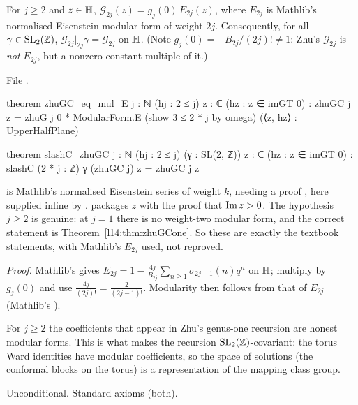 \begin{theorem}\label{l14:thm:zhuGCE}
For $j\ge2$ and $z\in\mathbb{H}$, $\mathcal G_{2j}(z) = g_j(0)\,E_{2j}(z)$, where $E_{2j}$ is Mathlib's normalised Eisenstein
modular form of weight $2j$. Consequently, for all $\gamma\in\mathrm{SL}_2(\mathbb{Z})$, $\mathcal G_{2j}|_{2j}\gamma = \mathcal G_{2j}$ on
$\mathbb{H}$. (Note $g_j(0) = -B_{2j}/(2j)!\neq1$: Zhu's $\mathcal G_{2j}$ is \emph{not} $E_{2j}$, but a nonzero constant multiple of it.)
\end{theorem}
\noindent File .
\begin{leancode}
theorem zhuGC_eq_mul_E {j : ℕ} (hj : 2 ≤ j) {z : ℂ} (hz : z ∈ imGT 0) :
    zhuGC j z = zhuG j 0 * ModularForm.E (show 3 ≤ 2 * j by omega) (⟨z, hz⟩ : UpperHalfPlane)

theorem slashC_zhuGC {j : ℕ} (hj : 2 ≤ j) (γ : SL(2, ℤ)) {z : ℂ} (hz : z ∈ imGT 0) :
    slashC (2 * j : ℤ) γ (zhuGC j) z = zhuGC j z
\end{leancode}
\begin{dictionary}
 is Mathlib's normalised Eisenstein series of weight $k$, needing a proof , here
supplied inline by .  packages $z$ with the proof that $\operatorname{Im} z>0$. The
hypothesis $j\ge2$ is genuine: at $j=1$ there is no weight-two modular form, and the correct statement is
Theorem~\ref{l14:thm:zhuGCone}. So these are exactly the textbook statements, with Mathlib's $E_{2j}$ used, not reproved.
\end{dictionary}
\noindent\emph{Proof.} Mathlib's  gives $E_{2j} = 1 - \frac{4j}{B_{2j}}\sum_{n\ge1}\sigma_{2j-1}(n)q^n$
on $\mathbb{H}$; multiply by $g_j(0)$ and use $\frac{4j}{(2j)!} = \frac2{(2j-1)!}$. Modularity then follows from that of
$E_{2j}$ (Mathlib's ).
\begin{physics}
For $j\ge2$ the coefficients that appear in Zhu's genus-one recursion are honest modular forms. This is what makes the
recursion $\mathrm{SL}_2(\mathbb{Z})$-covariant: the torus Ward identities have modular coefficients, so the space of solutions (the
conformal blocks on the torus) is a representation of the mapping class group.
\end{physics}
\begin{status}
Unconditional. Standard axioms (both).
\end{status}

